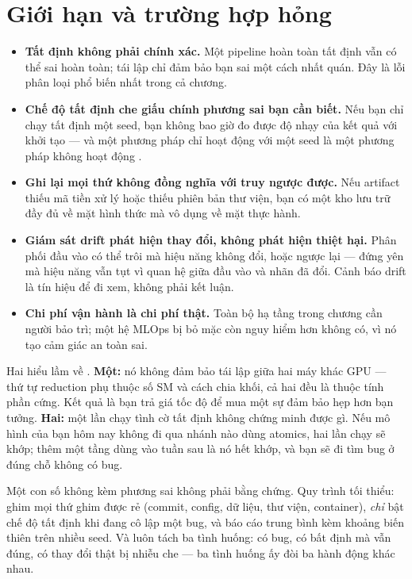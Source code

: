 \documentclass[../../deep_learning.tex]{subfiles}
\begin{document}
\section{Giới hạn và trường hợp hỏng}
\begin{itemize}
\item \textbf{Tất định không phải chính xác.} Một pipeline hoàn toàn tất định vẫn có thể sai hoàn toàn; tái lập chỉ đảm bảo bạn sai một cách nhất quán. Đây là lỗi phân loại phổ biến nhất trong cả chương.
\item \textbf{Chế độ tất định che giấu chính phương sai bạn cần biết.} Nếu bạn chỉ chạy tất định một seed, bạn không bao giờ đo được độ nhạy của kết quả với khởi tạo --- và một phương pháp chỉ hoạt động với một seed là một phương pháp không hoạt động \cite{henderson2018deep}.
\item \textbf{Ghi lại mọi thứ không đồng nghĩa với truy ngược được.} Nếu artifact thiếu mã tiền xử lý hoặc thiếu phiên bản thư viện, bạn có một kho lưu trữ đầy đủ về mặt hình thức mà vô dụng về mặt thực hành.
\item \textbf{Giám sát drift phát hiện thay đổi, không phát hiện thiệt hại.} Phân phối đầu vào có thể trôi mà hiệu năng không đổi, hoặc ngược lại --- đứng yên mà hiệu năng vẫn tụt vì quan hệ giữa đầu vào và nhãn đã đổi. Cảnh báo drift là tín hiệu để đi xem, không phải kết luận.
\item \textbf{Chi phí vận hành là chi phí thật.} Toàn bộ hạ tầng trong chương cần người bảo trì; một hệ MLOps bị bỏ mặc còn nguy hiểm hơn không có, vì nó tạo cảm giác an toàn sai.
\end{itemize}

\begin{cambay}
Hai hiểu lầm về . \textbf{Một:} nó không đảm bảo tái lập giữa hai máy khác GPU --- thứ tự reduction phụ thuộc số SM và cách chia khối, cả hai đều là thuộc tính phần cứng. Kết quả là bạn trả giá tốc độ để mua một sự đảm bảo hẹp hơn bạn tưởng. \textbf{Hai:} một lần chạy tình cờ tất định không chứng minh được gì. Nếu mô hình của bạn hôm nay không đi qua nhánh nào dùng atomics, hai lần chạy sẽ khớp; thêm một tầng dùng  vào tuần sau là nó hết khớp, và bạn sẽ đi tìm bug ở đúng chỗ không có bug.
\end{cambay}

\begin{cannho}
Một con số không kèm phương sai không phải bằng chứng. Quy trình tối thiểu: ghim mọi thứ ghim được rẻ (commit, config, dữ liệu, thư viện, container), \emph{chỉ} bật chế độ tất định khi đang cô lập một bug, và báo cáo trung bình kèm khoảng biến thiên trên nhiều seed. Và luôn tách ba tình huống: có bug, có bất định mà vẫn đúng, có thay đổi thật bị nhiễu che --- ba tình huống ấy đòi ba hành động khác nhau. 
\end{cannho}
\end{document}
